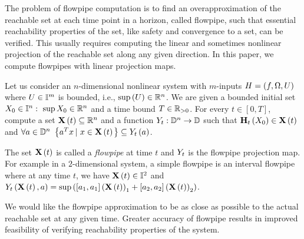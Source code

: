 The problem of flowpipe computation is to find an overapproximation of
the reachable set at each time point in a horizon, called flowpipe,
such that essential reachability properties of the set, like safety
and convergence to a set, can be verified.  This usually requires
computing the linear and sometimes nonlinear projection of the
reachable set along any given direction.  In this paper, we compute
flowpipes with linear projection maps.
%
\begin{problem}
Let us consider an $n$-dimensional nonlinear system with $m$-inputs $H
= \left(f,\Omega,U\right)$ where $U\in\mathbb{I}^m$ is bounded, i.e.,
$\sup\left(U\right)\in\mathbb{R}^n$.  We are given a bounded initial set
$X_0\in\mathbb{I}^n:~\sup{X_0}\in\mathbb{R}^n$ and a time bound
$T\in\mathbb{R}_{> 0}$.  For every $t\in[0,T]$, compute a set
$\mathbf{X}\left(t\right)\subseteq \mathbb{R}^n$ and a function
$Y_{t}:\mathbb{D}^n\rightarrow \mathbb{D}$ such that
$\mathbf{H}_{t}\left(X_0\right)\in\mathbf{X}\left(t\right)$ and $\forall
a\in\mathbb{D}^n~\left\{a^Tx\left|~x\in\mathbf{X}\left(t\right)\right.\right\}\subseteq
Y_{t}\left(a\right)$.
\end{problem}
%
The set $\mathbf{X}\left(t\right)$ is called a 
\emph{flowpipe} at time $t$ and $Y_{t}$ is the flowpipe projection map.
For example in a $2$-dimensional system, a simple flowpipe is an
interval flowpipe where at any time $t$, we have
$\mathbf{X}\left(t\right)\in\mathbb{I}^2$ and $Y_{t}\left(\mathbf{X}\left(t\right),a\right) =
\sup\left([a_1,a_1]\left(\mathbf{X}\left(t\right)\right)_1 + [a_2,a_2]\left(\mathbf{X}\left(t\right)\right)_2\right)$.

We would like the flowpipe approximation to be as close as possible to
the actual reachable set at any given time.  Greater accuracy of flowpipe results in
improved feasibility of verifying reachability properties of the
system.
